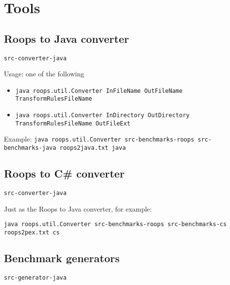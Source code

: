 \section{Tools}

\subsection{Roops to Java converter}

\verb|src-converter-java|

Usage: one of the following

\begin{itemize}
\item \verb|java roops.util.Converter InFileName OutFileName TransformRulesFileName|
\item \verb|java roops.util.Converter InDirectory OutDirectory TransformRulesFileName OutFileExt|
\end{itemize}

Example:
\verb|java roops.util.Converter src-benchmarks-roops src-benchmarks-java roops2java.txt java|


\subsection{Roops to C\# converter}

\verb|src-converter-java|

Just as the Roops to Java converter, for example:

\verb|java roops.util.Converter src-benchmarks-roops src-benchmarks-cs roops2pex.txt cs|



\subsection{Benchmark generators}

\verb|src-generator-java|
